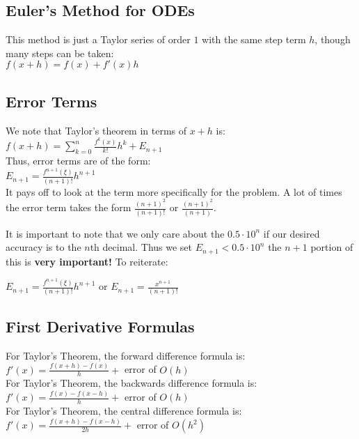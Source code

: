 \subsection*{Euler's Method for ODEs}
This method is just a Taylor series of order $1$ with the same step term $h$,
though many steps can be taken:\\
$ f(x + h) = f(x) + f'(x)h $\\

\subsection*{Error Terms}
We note that Taylor's theorem in terms of $x+h$ is:\\
$ f(x+h) = \sum_{k=0}^{n} \frac{f^{k}(x)}{k!}h^k + E_{n+1} $\\
Thus, error terms are of the form:\\
$ E_{n+1} = \frac{f^{n+1}(\xi)}{(n+1)!}h^{n+1}$\\

It pays off to look at the term more specifically for the problem. A lot of times the
error term takes the form $\frac{(n+1)^2}{(n+1)!}$ or $\frac{(n+1)^2}{(n+1)}$.

It is important to note that we only care about the $0.5 \cdot 10^n$ if our desired
accuracy is to the $n$th decimal. Thus we set $E_{n+1} < 0.5 \cdot 10^n$ the $n+1$
portion of this is \textbf{very important!} To reiterate:

$ E_{n+1} = \frac{f^{n+1}(\xi)}{(n+1)!}h^{n+1} $ or $E_{n+1} = \frac{x^{n+1}}{(n+1)!}$\\

\subsection*{First Derivative Formulas}
For Taylor's Theorem, the forward difference formula is:\\
$f'(x) = \frac{f(x+h) - f(x)}{h} + $ error of $O(h)$\\
For Taylor's Theorem, the backwards difference formula is:\\
$f'(x) = \frac{f(x) - f(x - h)}{h} + $ error of $O(h)$\\
For Taylor's Theorem, the central difference formula is:\\
$f'(x) = \frac{f(x + h) - f(x - h)}{2h} + $ error of $O(h^2)$\\









